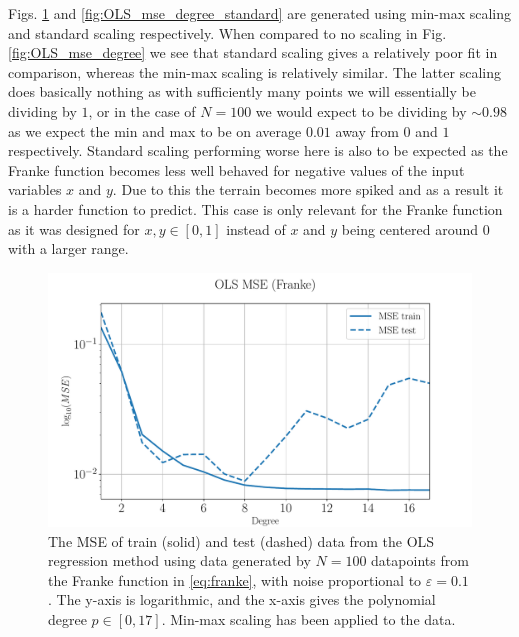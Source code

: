 \documentclass[%
reprint,
amsmath,amssymb,
aps,
pra,
]{revtex4-2}
\begin{document}
Figs. \ref{fig:OLS_mse_degree_minmax} and \ref{fig:OLS_mse_degree_standard} are generated using min-max scaling and standard scaling respectively. When compared to no scaling in Fig. \ref{fig:OLS_mse_degree} we see that standard scaling gives a relatively poor fit in comparison, whereas the min-max scaling is relatively similar. The latter scaling does basically nothing as with sufficiently many points we will essentially be dividing by $1$, or in the case of $N=100$ we would expect to be dividing by $\sim0.98$ as we expect the min and max to be on average $0.01$ away from $0$ and $1$ respectively. Standard scaling performing worse here is also to be expected as the Franke function becomes less well behaved for negative values of the input variables $x$ and $y$. Due to this the terrain becomes more spiked and as a result it is a harder function to predict. This case is only relevant for the Franke function as it was designed for $x,y\in[0,1]$ instead of $x$ and $y$ being centered around $0$ with a larger range.
\begin{figure}[ht!]
	\centering
	\includegraphics[width=\linewidth]{Python/Figures/OLS/OLS_MSE_MINMAX.pdf}
	\caption{The MSE of train (solid) and test (dashed) data from the OLS regression method using data generated by \(N=100\) datapoints from the Franke function in \eqref{eq:franke}, with noise proportional to \(\varepsilon=0.1\). The y-axis is logarithmic, and the x-axis gives the polynomial degree \(p\in[0,17]\). Min-max scaling has been applied to the data.}
	\label{fig:OLS_mse_degree_minmax}
\end{figure}
\end{document}
